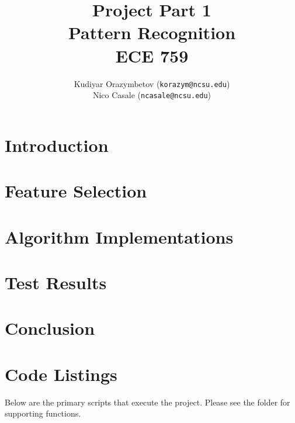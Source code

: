 \documentclass[]{ncmathy}
\newcommand{\theassignment}{Project Part 1}
\newcommand{\thecourse}{Pattern Recognition\\ECE 759}
\begin{document}
\title{\theassignment\\\thecourse}
\author{Kudiyar Orazymbetov (\texttt{korazym@ncsu.edu})\\Nico Casale (\texttt{ncasale@ncsu.edu})}

\makeFancyTitle

\tableofcontents
\pagebreak
\makeatletter
\let\@starttoc\@multitoc@starttoc
\listoffigures
\listoftables
\lstlistoflistings
\makeatother

\pagebreak

\section{Introduction} 
	

\section{Feature Selection}
	

\section{Algorithm Implementations}
	
        
	

\section{Test Results}
	

\section{Conclusion}
	




\section{Code Listings}

Below are the primary scripts that execute the project. Please see the
 folder for supporting functions.





\end{document}
